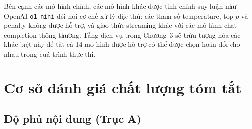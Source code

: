 Bên cạnh các mô hình chính, các mô hình khác được tinh chỉnh suy luận như OpenAI \texttt{o1-mini} đòi hỏi cơ chế xử lý đặc thù: các tham số temperature, top-$p$ và penalty không được hỗ trợ, và giao thức streaming khác với các mô hình chat-completion thông thường. Tầng dịch vụ trong Chương~3 sẽ trừu tượng hóa các khác biệt này để tất cả 14 mô hình được hỗ trợ có thể được chọn hoán đổi cho nhau trong quá trình thực thi.

\section{Cơ sở đánh giá chất lượng tóm tắt}

\subsection{Độ phủ nội dung (Trục A)}

